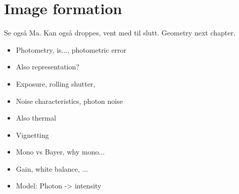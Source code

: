 \chapter{Image formation}
Se også Ma.
Kan også droppes, vent med til slutt.
Geometry next chapter.

\begin{itemize}
    \item Photometry, is..., photometric error
    \item Also representation?
    \item Exposure, rolling shutter, 
    \item Noise characteristics, photon noise
    \item Also thermal
    \item Vignetting
    \item Mono vs Bayer, why mono...
    \item Gain, white balance, ...
    \item Model: Photon -> intensity
\end{itemize}
